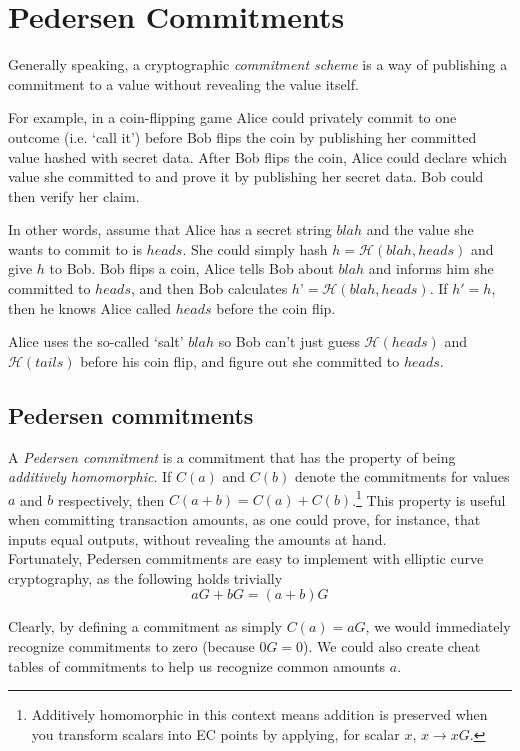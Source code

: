 \chapter{Pedersen Commitments}
\label{chapter:pedersen-commitments}


Generally speaking, a cryptographic {\em commitment scheme} is a way of publishing a commitment to a value without revealing the value itself.

For example, in a coin-flipping game Alice could privately commit to one outcome (i.e. ‘call it’) before Bob flips the coin by publishing her committed value hashed with secret data. After Bob flips the coin, Alice could declare which value she committed to and prove it by publishing her secret data. Bob could then verify her claim.

In other words, assume that Alice has a secret string $blah$ and the value she wants to commit to is $heads$. She could simply hash $h = \mathcal{H}(blah, heads)$ and give $h$ to Bob. Bob flips a coin, Alice tells Bob about $blah$ and informs him she committed to $heads$, and then Bob calculates $h’ = \mathcal{H}(blah, heads)$. If $h' = h$, then he knows Alice called $heads$ before the coin flip.

Alice uses the so-called `salt' $blah$ so Bob can't just guess $\mathcal{H}(heads)$ and $\mathcal{H}(tails)$ before his coin flip, and figure out she committed to $heads$.

\section{Pedersen commitments}
\label{pedersen_section}

A {\em Pedersen commitment} \cite{Pedersen1992} is a commitment that has the property of being {\em additively homomorphic}. If \(C(a)\) and \(C(b)\) denote the commitments for values \(a\) and \(b\) respectively, then \(C(a + b) = C(a) + C(b)\).\footnote{Additively homomorphic in this context means addition is preserved when you transform scalars into EC points by applying, for scalar $x$, $x \rightarrow x G$.} This property is useful when committing transaction amounts, as one could prove, for instance, that inputs equal outputs, without revealing the amounts at hand.
\\

Fortunately, Pedersen commitments are easy to implement with elliptic curve cryptography, as the following holds trivially \[a G + b G = (a + b) G\]

Clearly, by defining a commitment as simply \(C(a) = a G\), we would immediately recognize commitments to zero (because $0G = 0$). We could also create cheat tables of commitments to help us recognize common amounts $a$.

